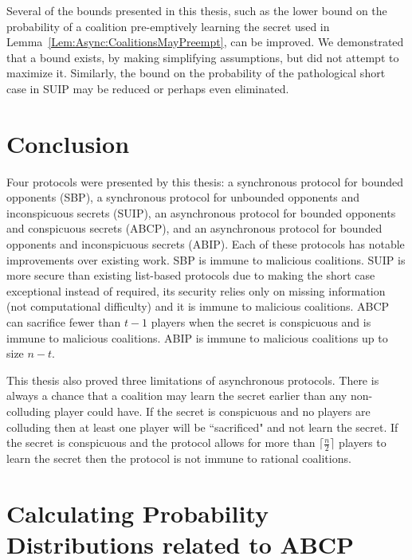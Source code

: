 \documentclass[12pt]{dalcsthesis}
\begin{document}
Several of the bounds presented in this thesis, such as the lower bound on the probability of a coalition pre-emptively learning the secret used in Lemma~\ref{Lem:Async:CoalitionsMayPreempt}, can be improved. We demonstrated that a bound exists, by making simplifying assumptions, but did not attempt to maximize it. Similarly, the bound on the probability of the pathological short case in SUIP may be reduced or perhaps even eliminated. 



\chapter{Conclusion}
\label{chapter:Conclusion}

Four protocols were presented by this thesis: a synchronous protocol for bounded opponents (SBP), a synchronous protocol for unbounded opponents and inconspicuous secrets (SUIP), an asynchronous protocol for bounded opponents and conspicuous secrets (ABCP), and an asynchronous protocol for bounded opponents and inconspicuous secrets (ABIP). Each of these protocols has notable improvements over existing work. SBP is immune to malicious coalitions. SUIP is more secure than existing list-based protocols due to making the short case exceptional instead of required, its security relies only on missing information (not computational difficulty) and it is immune to malicious coalitions. ABCP can sacrifice fewer than $t-1$ players when the secret is conspicuous and is immune to malicious coalitions. ABIP is immune to malicious coalitions up to size $n-t$.

This thesis also proved three limitations of asynchronous protocols. There is always a chance that a coalition may learn the secret earlier than any non-colluding player could have. If the secret is conspicuous and no players are colluding then at least one player will be ``sacrificed" and not learn the secret. If the secret is conspicuous and the protocol allows for more than $\lceil \frac{n}{2} \rceil$ players to learn the secret then the protocol is not immune to rational coalitions.









\appendix
\chapter{Calculating Probability Distributions related to ABCP }
\label{Appendix:ABCP:Probabilities}
\end{document}
